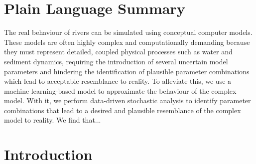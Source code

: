 \documentclass[draft,linenumbers,onecolumn]{agujournal2019} %
\begin{document}
\section*{Plain Language Summary}

The real behaviour of rivers can be simulated using conceptual computer models. These models are often highly complex and computationally demanding because they must represent detailed, coupled physical processes such as water and sediment dynamics, requiring the introduction of several uncertain model parameters and hindering the identification of plausible parameter combinations which lead to acceptable resemblance to reality. To alleviate this, we use a machine learning-based model to approximate the behaviour of the complex model. With it, we perform data-driven stochastic analysis to identify parameter combinations that lead to a desired and plausible resemblance of the complex model to reality. We find that...   


\section{Introduction}
\end{document}
